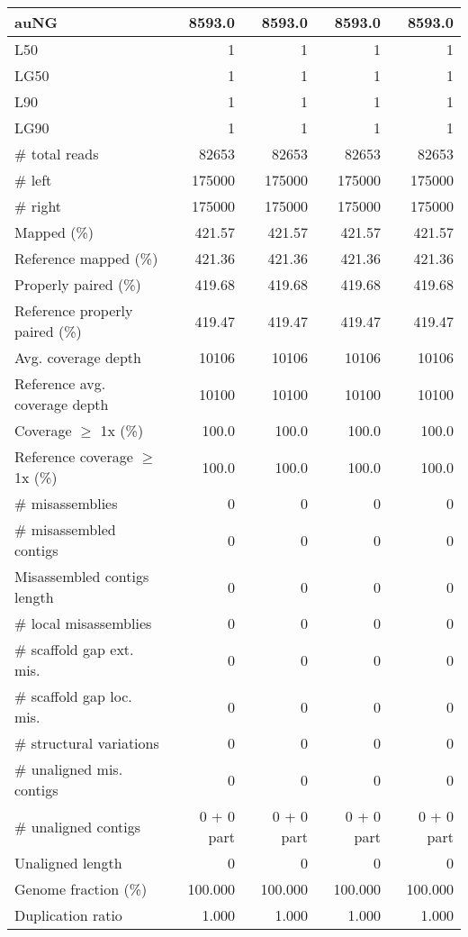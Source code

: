 \documentclass[12pt,a4paper]{article}
\begin{document}
\begin{table}[ht]
\begin{center}
\begin{tabular}{|l*{4}{|r}|}
auNG & 8593.0 & 8593.0 & 8593.0 & 8593.0 \\ \hline
L50 & 1 & 1 & 1 & 1 \\ \hline
LG50 & 1 & 1 & 1 & 1 \\ \hline
L90 & 1 & 1 & 1 & 1 \\ \hline
LG90 & 1 & 1 & 1 & 1 \\ \hline
\# total reads & 82653 & 82653 & 82653 & 82653 \\ \hline
\# left & 175000 & 175000 & 175000 & 175000 \\ \hline
\# right & 175000 & 175000 & 175000 & 175000 \\ \hline
Mapped (\%) & 421.57 & 421.57 & 421.57 & 421.57 \\ \hline
Reference mapped (\%) & 421.36 & 421.36 & 421.36 & 421.36 \\ \hline
Properly paired (\%) & 419.68 & 419.68 & 419.68 & 419.68 \\ \hline
Reference properly paired (\%) & 419.47 & 419.47 & 419.47 & 419.47 \\ \hline
Avg. coverage depth & 10106 & 10106 & 10106 & 10106 \\ \hline
Reference avg. coverage depth & 10100 & 10100 & 10100 & 10100 \\ \hline
Coverage $\geq$ 1x (\%) & 100.0 & 100.0 & 100.0 & 100.0 \\ \hline
Reference coverage $\geq$ 1x (\%) & 100.0 & 100.0 & 100.0 & 100.0 \\ \hline
\# misassemblies & 0 & 0 & 0 & 0 \\ \hline
\# misassembled contigs & 0 & 0 & 0 & 0 \\ \hline
Misassembled contigs length & 0 & 0 & 0 & 0 \\ \hline
\# local misassemblies & 0 & 0 & 0 & 0 \\ \hline
\# scaffold gap ext. mis. & 0 & 0 & 0 & 0 \\ \hline
\# scaffold gap loc. mis. & 0 & 0 & 0 & 0 \\ \hline
\# structural variations & 0 & 0 & 0 & 0 \\ \hline
\# unaligned mis. contigs & 0 & 0 & 0 & 0 \\ \hline
\# unaligned contigs & 0 + 0 part & 0 + 0 part & 0 + 0 part & 0 + 0 part \\ \hline
Unaligned length & 0 & 0 & 0 & 0 \\ \hline
Genome fraction (\%) & 100.000 & 100.000 & 100.000 & 100.000 \\ \hline
Duplication ratio & 1.000 & 1.000 & 1.000 & 1.000 \\ \hline

\end{tabular}
\end{center}
\end{table}
\end{document}
